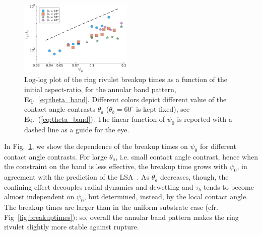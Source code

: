 \documentclass[twoside,twocolumn,9pt]{article}
\begin{document}
\begin{figure}
    \centering
    \includegraphics[width=0.48\textwidth]{assets/breakup_band_hmm.pdf}
    \caption{Log-log plot of the ring rivulet breakup times as a function of the initial aspect-ratio, for the annular band pattern, Eq.~\ref{eq:theta_band}.
    Different colors depict different value of the contact angle contrasts $\theta_a$ ($\theta_b = 60^{\circ}$ is kept fixed), see Eq.~(\ref{eq:theta_band}).
    The linear function of $\psi_0$ is reported with a dashed line as a guide for the eye.
    }
    \label{fig:bandBreakupT}
\end{figure}
In Fig.~\ref{fig:bandBreakupT}, we show the dependence of the breakup times on $\psi_0$ for different contact angle contrasts. For large $\theta_a$, i.e. small contact angle contrast, hence 
when the constraint on the band is less effective, the breakup time grows with $\psi_0$, in agreement with the prediction of the LSA~\cite{gonzalezStabilityLiquidRing2013}. As $\theta_a$ decreases, though, the confining effect decouples radial dynamics and dewetting and $\tau_b$ tends to become almost independent on 
$\psi_0$, but determined, instead, by the local contact angle. The breakup times are larger than in the uniform substrate case (cfr. Fig~\ref{fig:breakuptimes}): so, overall the annular band pattern 
makes the ring rivulet slightly more stable against rupture.
\end{document}
